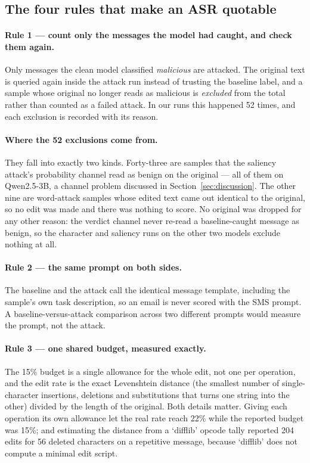 \subsection{The four rules that make an ASR quotable}

\paragraph{Rule 1 --- count only the messages the model had caught, and check them
again.}
Only messages the clean model classified \emph{malicious} are attacked. The
original text is queried again inside the attack run instead of trusting the
baseline label, and a sample whose original no longer reads as malicious is
\emph{excluded} from the total rather than counted as a failed attack. In our
runs this happened 52 times, and each exclusion is recorded with its reason.

\paragraph{Where the 52 exclusions come from.} They fall into exactly two kinds.
Forty-three are samples that the saliency attack's probability channel read as
benign on the original --- all of them on Qwen2.5-3B, a channel problem discussed
in Section~\ref{sec:discussion}. The other nine are word-attack samples whose edited
text came out identical to the original, so no edit was made and there was
nothing to score. No original was dropped for any other reason: the verdict
channel never re-read a baseline-caught message as benign, so the character and
saliency runs on the other two models exclude nothing at all.

\paragraph{Rule 2 --- the same prompt on both sides.}
The baseline and the attack call the identical message template, including the
sample's own task description, so an email is never scored with the SMS prompt.
A baseline-versus-attack comparison across two different prompts would measure
the prompt, not the attack.

\paragraph{Rule 3 --- one shared budget, measured exactly.}
The 15\% budget is a single allowance for the whole edit, not one per operation,
and the edit rate is the exact Levenshtein distance (the smallest number of
single-character insertions, deletions and substitutions that turns one string
into the other) divided by the length of the original. Both details matter.
Giving each operation its own allowance let the real rate reach 22\% while the
reported budget was 15\%; and estimating the distance from a `difflib' opcode tally
reported 204 edits for 56 deleted characters on a repetitive message, because
`difflib' does not compute a minimal edit script.

